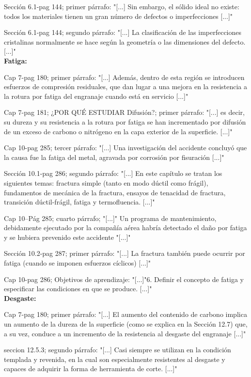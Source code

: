 \documentclass[12pt,a4paper]{article}
\begin{document}
Sección 6.1-pag 144; primer párrafo: "[...] Sin embargo, el sólido ideal no existe: todos los materiales tienen un gran número de defectos o imperfecciones [...]"

Sección 6.1-pag 144; segundo párrafo: "[...] La clasificación de las imperfecciones cristalinas normalmente se hace según la geometría o las dimensiones del defecto. [...]"\\[0.1cm]

\textbf{Fatiga:}

Cap 7-pag 180; primer párrafo: "[...] Además, dentro de esta región se introducen esfuerzos de compresión residuales, que dan lugar a una mejora en la resistencia a la rotura por fatiga del engranaje cuando está en servicio [...]"

Cap 7-pag 181; ¿POR QUÉ ESTUDIAR Difusión?; primer párrafo: "[...] es decir, su dureza y su resistencia a la rotura por fatiga se han incrementado por difusión de un exceso de carbono o nitrógeno en la capa exterior de la superficie. [...]"

Cap 10-pag 285; tercer párrafo: "[...] Una investigación del accidente concluyó
que la causa fue la fatiga del metal, agravada por corrosión por fisuración [...]"

Sección 10.1-pag 286; segundo párrafo: "[...] En este capítulo se tratan los siguientes temas: fractura simple (tanto en modo dúctil como frágil), fundamentos de mecánica de la fractura, ensayos de tenacidad de fractura, transición dúctil-frágil, fatiga y termofluencia. [...]"

Cap 10–Pág 285; cuarto párrafo; "[...]" Un programa de mantenimiento, debidamente ejecutado por la compañía aérea habría detectado el daño por fatiga y se hubiera prevenido este accidente "[...]"

Sección 10.2-pag 287; primer párrafo: "[...] La fractura también puede ocurrir por fatiga (cuando se imponen esfuerzos cíclicos) [...]"

Cap 10-pag 286; Objetivos de aprendizaje: "[...]"6. Definir el concepto de fatiga y especificar las
condiciones en que se produce. [...]"\\[0.1cm]

\textbf{Desgaste:}

Cap 7-pag 180; primer párrafo: "[...] El aumento del contenido de carbono implica un aumento de la dureza de la superficie (como se explica en la Sección 12.7) que, a su vez, conduce a un incremento de la resistencia al desgaste del engranaje [...]"

seccion 12.5.3; segundo párrafo: "[...] Casi siempre se utilizan en la condición templada y revenida, en la cual son especialmente resistentes al desgaste y capaces de adquirir la forma de herramienta de corte. [...]"
\end{document}
